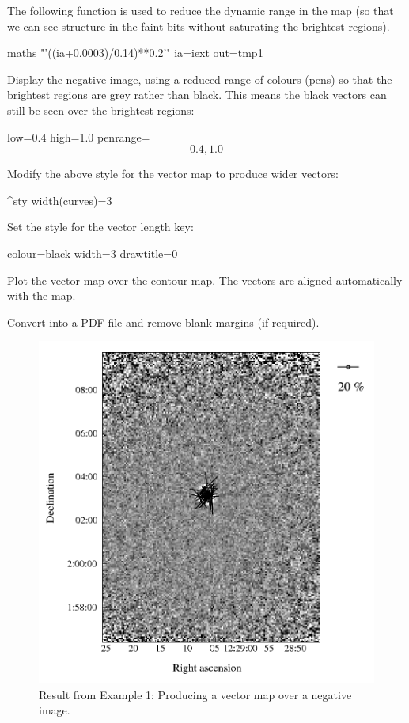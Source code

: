 The following function is used to reduce the dynamic range in the map (so
that we can see structure in the faint bits without saturating the
brightest regions).

\begin{terminalv}
maths "'((ia+0.0003)/0.14)**0.2'" ia=iext out=tmp1
\end{terminalv}


Display the negative image, using a reduced range of colours (pens) so
that the brightest regions are grey rather than black.  This means the
black vectors can still be seen over the brightest regions:

\begin{terminalv}
        low=0.4 high=1.0
        penrange=\[0.4,1.0\]
\end{terminalv}


Modify the above style for the vector map to produce wider vectors:

\begin{terminalv}
^sty
width(curves)=3
\end{terminalv}


Set the style for the vector length key:

\begin{terminalv}
colour=black
width=3
drawtitle=0
\end{terminalv}


Plot the vector map over the contour map. The vectors are aligned automatically with the map.

\begin{terminalv}
\end{terminalv}


Convert into a PDF file and remove blank margins (if required).

\begin{terminalv}
\end{terminalv}


\begin{figure}[t!]
\begin{center}
\includegraphics[width=0.75\linewidth]{sc22-kappa-plots-plot3.png}
\caption [Vector map with negative image in polplot]{Result from
  Example 1: Producing a vector map over a negative image.\label{fig:kappa-plot3}}
\end{center}
\end{figure}


